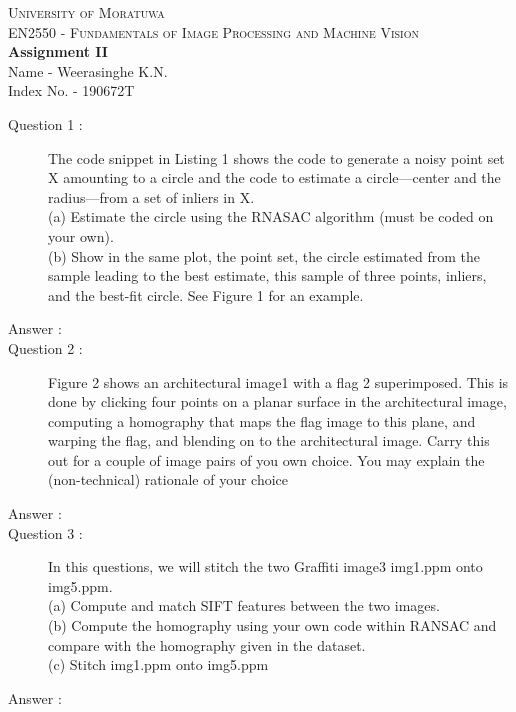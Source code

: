 \documentclass[a4paper, 12pt]{article}
\begin{document}
\centering
\colorbox{white!10!}{
    \begin{minipage}[H]{\textwidth}
        \begin{center}
            {\large \textsc{University of Moratuwa}}\\
            {\large \textsc{EN2550 - Fundamentals of Image Processing and Machine Vision}}
            \vspace{0.25cm}
            \\
            { \huge \textbf{Assignment II}}
            \\
            \vspace{0.25cm}
            \small Name - Weerasinghe K.N.\\
            \small Index No. - 190672T
        \end{center}
    \end{minipage}
}
\begin{center}
\end{center}

\begin{description}
   \item[Question 1 :] The code snippet in Listing 1 shows the code to generate a noisy point set X amounting to a circle and the code to estimate a circle—center and the radius—from a set of inliers in X.\\
(a) Estimate the circle using the RNASAC algorithm (must be coded on your own).\\
(b) Show in the same plot, the point set, the circle estimated from the sample leading to the best estimate, this sample of three points, inliers, and the best-fit circle. See Figure 1 for an example.
    \item[Answer :]
    

    \item[Question 2 :]  Figure 2 shows an architectural image1 with a flag 2
superimposed. This is done by clicking four points on a planar surface in the architectural image, computing a homography that maps the flag image to this plane,
and warping the flag, and blending on to the architectural image. Carry this out for a couple of image pairs of you own choice. You may explain the (non-technical) rationale of your choice
    \item[Answer :]
    

    \item[Question 3 :] In this questions, we will stitch the two Graffiti image3
img1.ppm onto img5.ppm.\\
(a) Compute and match SIFT features between the two images.\\
(b) Compute the homography using your own code within RANSAC and compare with the homography given in the dataset.\\
(c) Stitch img1.ppm onto img5.ppm
    \item[Answer :]
\end{description}
\end{document}
